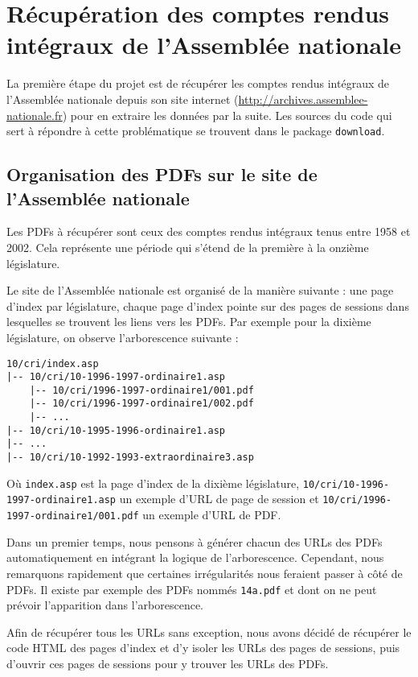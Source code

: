 \section[Récupération des comptes rendus intégraux]{Récupération des comptes rendus intégraux de l'Assemblée nationale}

La première étape du projet est de récupérer les comptes rendus intégraux de l'Assemblée nationale depuis son site internet (\url{http://archives.assemblee-nationale.fr}) pour en extraire les données par la suite. Les sources du code qui sert à répondre à cette problématique se trouvent dans le package \verb|download|.

\subsection{Organisation des PDFs sur le site de l'Assemblée nationale}

Les PDFs à récupérer sont ceux des comptes rendus intégraux tenus entre 1958 et 2002. Cela représente une période qui s'étend de la première à la onzième législature.

Le site de l'Assemblée nationale est organisé de la manière suivante : une page d'index par législature, chaque page d'index pointe sur des pages de sessions dans lesquelles se trouvent les liens vers les PDFs. Par exemple pour la dixième législature, on observe l'arborescence suivante :
\begin{verbatim}
10/cri/index.asp
|-- 10/cri/10-1996-1997-ordinaire1.asp
    |-- 10/cri/1996-1997-ordinaire1/001.pdf
    |-- 10/cri/1996-1997-ordinaire1/002.pdf
    |-- ...
|-- 10/cri/10-1995-1996-ordinaire1.asp
|-- ...
|-- 10/cri/10-1992-1993-extraordinaire3.asp
\end{verbatim}
Où \verb|index.asp| est la page d'index de la dixième législature, \verb|10/cri/10-1996-1997-ordinaire1.asp| un exemple d'URL de page de session et \verb|10/cri/1996-1997-ordinaire1/001.pdf| un exemple d'URL de PDF.

Dans un premier temps, nous pensons à générer chacun des URLs des PDFs automatiquement en intégrant la logique de l'arborescence. Cependant, nous remarquons rapidement que certaines irrégularités nous feraient passer à côté de PDFs. Il existe par exemple des PDFs nommés \verb|14a.pdf| et dont on ne peut prévoir l'apparition dans l'arborescence.

Afin de récupérer tous les URLs sans exception, nous avons décidé de récupérer le code HTML des pages d'index et d'y isoler les URLs des pages de sessions, puis d'ouvrir ces pages de sessions pour y trouver les URLs des PDFs.

